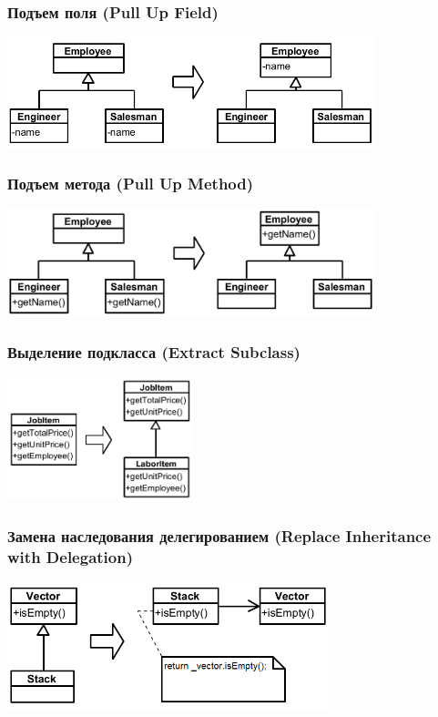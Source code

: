 \documentclass{../../slides-style}
\begin{document}
    \begin{frame}
        \frametitle{Подъем поля (Pull Up Field)}
        \begin{center}
            \includegraphics[width=0.8\textwidth]{pullUpField.png}
        \end{center}
    \end{frame}

    \begin{frame}
        \frametitle{Подъем метода (Pull Up Method)}
        \begin{center}
            \includegraphics[width=0.8\textwidth]{pullUpMethod.png}
        \end{center}
    \end{frame}

    \begin{frame}
        \frametitle{Выделение подкласса (Extract Subclass)}
        \begin{center}
            \includegraphics[width=0.4\textwidth]{extractSubclass.png}
        \end{center}
    \end{frame}

    \begin{frame}
        \frametitle{Замена наследования делегированием (Replace Inheritance with Delegation)}
        \begin{center}
            \includegraphics[width=0.7\textwidth]{replaceInheritanceWithDelegation.png}
        \end{center}
    \end{frame}
\end{document}
